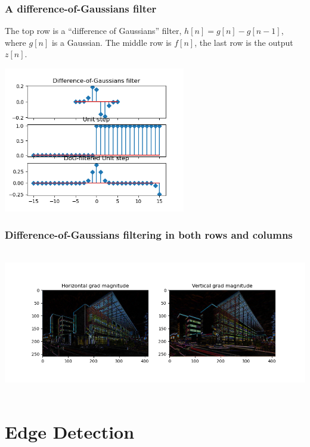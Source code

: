 \documentclass{beamer}
\begin{document}
\begin{frame}
  \frametitle{A difference-of-Gaussians filter}

  The top row is a ``difference of Gaussians'' filter,
  $h[n]=g[n]-g[n-1]$, where $g[n]$ is a Gaussian.  The middle row is
  $f[n]$, the last row is the output $z[n]$.
  \centerline{\includegraphics[height=2.5in]{mp1fig7.png}}
\end{frame}

\begin{frame}
  \frametitle{Difference-of-Gaussians filtering in both rows and columns}
      
  \centerline{\includegraphics[height=2.5in]{mp1fig8.png}}
\end{frame}

\section[Edges]{Edge Detection}
\setcounter{subsection}{1}
\end{document}

